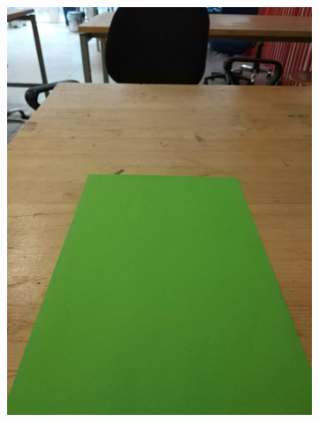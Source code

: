 \documentclass[a4paper,12pt]{article}
\begin{document}
\begin{appendices}
\begin{figure}[H]
		\centering
		\begin{subfigure}{.5\textwidth}
	  		\centering
	  		\includegraphics[width=.98\textwidth]{1}
		\end{subfigure}%
		\begin{subfigure}{.5\textwidth}
	  		\centering

\end{subfigure}
\end{figure}
\end{appendices}
\end{document}
